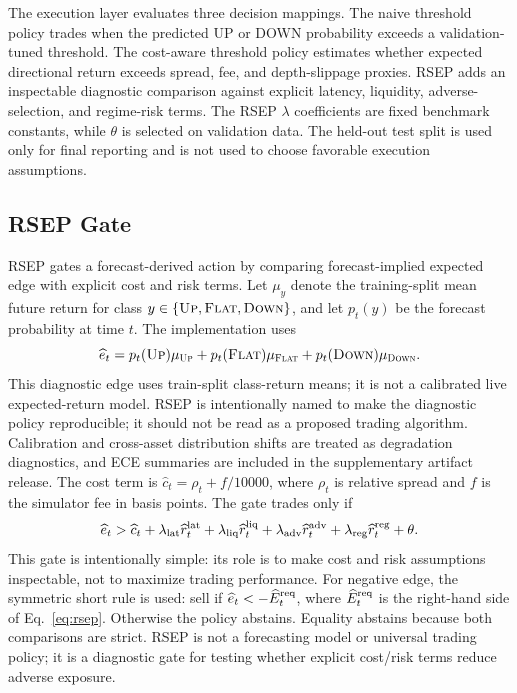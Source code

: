 \documentclass[conference]{IEEEtran}
\begin{document}
The execution layer evaluates three decision mappings. The naive threshold policy trades when the predicted UP or DOWN probability exceeds a validation-tuned threshold. The cost-aware threshold policy estimates whether expected directional return exceeds spread, fee, and depth-slippage proxies. RSEP adds an inspectable diagnostic comparison against explicit latency, liquidity, adverse-selection, and regime-risk terms. The RSEP $\lambda$ coefficients are fixed benchmark constants, while $\theta$ is selected on validation data. The held-out test split is used only for final reporting and is not used to choose favorable execution assumptions.

\subsection{RSEP Gate}
RSEP gates a forecast-derived action by comparing forecast-implied expected edge with explicit cost and risk terms. Let $\mu_y$ denote the training-split mean future return for class $y\in\{\textsc{Up},\textsc{Flat},\textsc{Down}\}$, and let $p_t(y)$ be the forecast probability at time $t$. The implementation uses
\begin{equation}
\widehat{e}_t=
p_t(\textsc{Up})\mu_{\textsc{Up}}+
p_t(\textsc{Flat})\mu_{\textsc{Flat}}+
p_t(\textsc{Down})\mu_{\textsc{Down}}.
\label{eq:rsep_edge}
\end{equation}
This diagnostic edge uses train-split class-return means; it is not a calibrated live expected-return model. RSEP is intentionally named to make the diagnostic policy reproducible; it should not be read as a proposed trading algorithm. Calibration and cross-asset distribution shifts are treated as degradation diagnostics, and ECE summaries are included in the supplementary artifact release.
The cost term is $\widehat{c}_t=\rho_t+f/10000$, where $\rho_t$ is relative spread and $f$ is the simulator fee in basis points. The gate trades only if
\begin{equation}
\widehat{e}_t>
\widehat{c}_t+
\lambda_{\rm lat}\widehat{r}^{\rm lat}_t+
\lambda_{\rm liq}\widehat{r}^{\rm liq}_t+
\lambda_{\rm adv}\widehat{r}^{\rm adv}_t+
\lambda_{\rm reg}\widehat{r}^{\rm reg}_t+\theta.
\label{eq:rsep}
\end{equation}
This gate is intentionally simple: its role is to make cost and risk assumptions inspectable, not to maximize trading performance.
For negative edge, the symmetric short rule is used: sell if $\widehat{e}_t<-\widehat{E}^{\rm req}_t$, where $\widehat{E}^{\rm req}_t$ is the right-hand side of Eq.~\eqref{eq:rsep}. Otherwise the policy abstains. Equality abstains because both comparisons are strict. RSEP is not a forecasting model or universal trading policy; it is a diagnostic gate for testing whether explicit cost/risk terms reduce adverse exposure.
\end{document}
